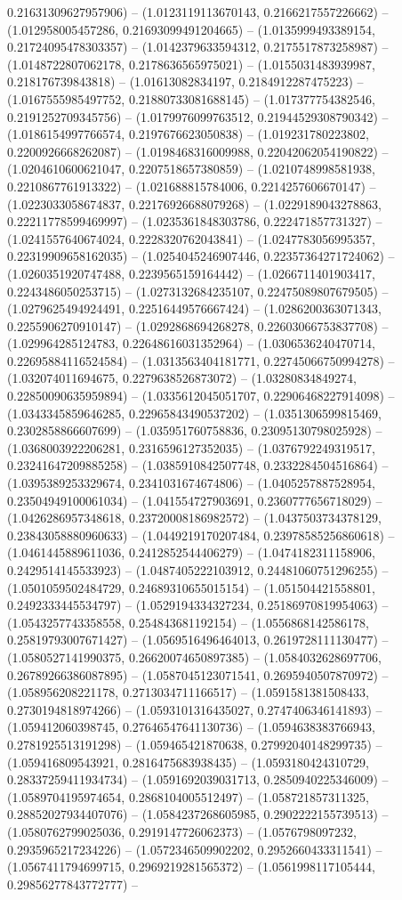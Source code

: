 0.21631309627957906) -- (1.0123119113670143, 0.2166217557226662) -- (1.012958005457286, 0.21693099491204665) -- (1.0135999493389154, 0.21724095478303357) -- (1.0142379633594312, 0.2175517873258987) -- (1.0148722807062178, 0.2178636565975021) -- (1.0155031483939987, 0.218176739843818) -- (1.01613082834197, 0.2184912287475223) -- (1.0167555985497752, 0.21880733081688145) -- (1.017377754382546, 0.2191252709345756) -- (1.0179976099763512, 0.21944529308790342) -- (1.0186154997766574, 0.2197676623050838) -- (1.019231780223802, 0.2200926668262087) -- (1.0198468316009988, 0.22042062054190822) -- (1.0204610600621047, 0.2207518657380859) -- (1.0210748998581938, 0.2210867761913322) -- (1.021688815784006, 0.2214257606670147) -- (1.0223033058674837, 0.22176926688079268) -- (1.0229189043278863, 0.22211778599469997) -- (1.0235361848303786, 0.222471857731327) -- (1.0241557640674024, 0.2228320762043841) -- (1.0247783056995357, 0.22319909658162035) -- (1.0254045246907446, 0.22357364271724062) -- (1.0260351920747488, 0.2239565159164442) -- (1.0266711401903417, 0.2243486050253715) -- (1.0273132684235107, 0.22475089807679505) -- (1.0279625494924491, 0.22516449576667424) -- (1.0286200363071343, 0.2255906270910147) -- (1.0292868694268278, 0.22603066753837708) -- (1.029964285124783, 0.22648616031352964) -- (1.0306536240470714, 0.22695884116524584) -- (1.0313563404181771, 0.22745066750994278) -- (1.032074011694675, 0.2279638526873072) -- (1.03280834849274, 0.22850090635959894) -- (1.0335612045051707, 0.22906468227914098) -- (1.0343345859646285, 0.22965843490537202) -- (1.0351306599815469, 0.2302858866607699) -- (1.035951760758836, 0.23095130798025928) -- (1.0368003922206281, 0.2316596127352035) -- (1.0376792249319517, 0.23241647209885258) -- (1.0385910842507748, 0.2332284504516864) -- (1.0395389253329674, 0.2341031674674806) -- (1.0405257887528954, 0.23504949100061034) -- (1.041554727903691, 0.2360777656718029) -- (1.0426286957348618, 0.23720008186982572) -- (1.0437503734378129, 0.23843058880960633) -- (1.0449219170207484, 0.23978585256860618) -- (1.0461445889611036, 0.2412852544406279) -- (1.0474182311158906, 0.2429514145533923) -- (1.0487405222103912, 0.24481060751296255) -- (1.0501059502484729, 0.24689310655015154) -- (1.051504421558801, 0.2492333445534797) -- (1.0529194334327234, 0.25186970819954063) -- (1.0543257743358558, 0.254843681192154) -- (1.0556868142586178, 0.25819793007671427) -- (1.0569516496464013, 0.2619728111130477) -- (1.0580527141990375, 0.26620074650897385) -- (1.0584032628697706, 0.26789266386087895) -- (1.0587045123071541, 0.2695940507870972) -- (1.058956208221178, 0.2713034711166517) -- (1.0591581381508433, 0.2730194818974266) -- (1.0593101316435027, 0.2747406346141893) -- (1.059412060398745, 0.27646547641130736) -- (1.0594638383766943, 0.2781925513191298) -- (1.059465421870638, 0.27992040148299735) -- (1.059416809543921, 0.2816475683938435) -- (1.0593180424310729, 0.28337259411934734) -- (1.0591692039031713, 0.2850940225346009) -- (1.0589704195974654, 0.2868104005512497) -- (1.058721857311325, 0.28852027934407076) -- (1.0584237268605985, 0.2902222155739513) -- (1.0580762799025036, 0.2919147726062373) -- (1.0576798097232, 0.2935965217234226) -- (1.0572346509902202, 0.2952660433311541) -- (1.0567411794699715, 0.2969219281565372) -- (1.0561998117105444, 0.29856277843772777) -- 